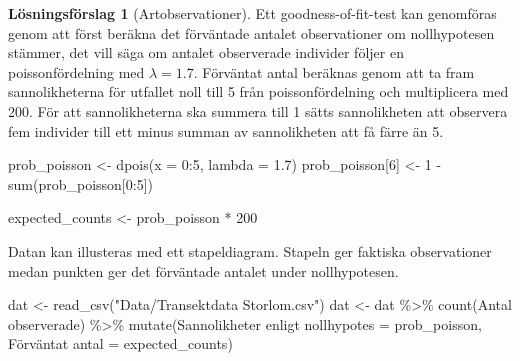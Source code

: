 \documentclass[
]{book}
\newenvironment{Shaded}{\begin{snugshade}}{\end{snugshade}}
\newcommand{\AttributeTok}[1]{\textcolor[rgb]{0.77,0.63,0.00}{#1}}
\newcommand{\DecValTok}[1]{\textcolor[rgb]{0.00,0.00,0.81}{#1}}
\newcommand{\FloatTok}[1]{\textcolor[rgb]{0.00,0.00,0.81}{#1}}
\newcommand{\FunctionTok}[1]{\textcolor[rgb]{0.00,0.00,0.00}{#1}}
\newcommand{\NormalTok}[1]{#1}
\newcommand{\OtherTok}[1]{\textcolor[rgb]{0.56,0.35,0.01}{#1}}
\newcommand{\SpecialCharTok}[1]{\textcolor[rgb]{0.00,0.00,0.00}{#1}}
\newcommand{\StringTok}[1]{\textcolor[rgb]{0.31,0.60,0.02}{#1}}
\theoremstyle{definition}
\theoremstyle{definition}
\theoremstyle{definition}
\theoremstyle{definition}
\newtheorem{hypothesis}{Lösningsförslag}[chapter]
\theoremstyle{remark}
\begin{document}
\begin{hypothesis}[Artobservationer]
Ett goodness-of-fit-test kan genomföras genom att först beräkna det förväntade antalet observationer om nollhypotesen stämmer, det vill säga om antalet observerade individer följer en poissonfördelning med \(\lambda = 1.7\).
Förväntat antal beräknas genom att ta fram sannolikheterna för utfallet noll till 5 från poissonfördelning och multiplicera med 200.
För att sannolikheterna ska summera till 1 sätts sannolikheten att observera fem individer till ett minus summan av sannolikheten att få färre än 5.

\begin{Shaded}
\begin{Highlighting}[]
\NormalTok{prob\_poisson }\OtherTok{\textless{}{-}} \FunctionTok{dpois}\NormalTok{(}\AttributeTok{x =} \DecValTok{0}\SpecialCharTok{:}\DecValTok{5}\NormalTok{, }\AttributeTok{lambda =} \FloatTok{1.7}\NormalTok{)}
\NormalTok{prob\_poisson[}\DecValTok{6}\NormalTok{] }\OtherTok{\textless{}{-}} \DecValTok{1} \SpecialCharTok{{-}} \FunctionTok{sum}\NormalTok{(prob\_poisson[}\DecValTok{0}\SpecialCharTok{:}\DecValTok{5}\NormalTok{])}

\NormalTok{expected\_counts }\OtherTok{\textless{}{-}}\NormalTok{ prob\_poisson }\SpecialCharTok{*} \DecValTok{200}
\end{Highlighting}
\end{Shaded}

Datan kan illusteras med ett stapeldiagram. Stapeln ger faktiska observationer medan punkten ger det förväntade antalet under nollhypotesen.

\begin{Shaded}
\begin{Highlighting}[]
\NormalTok{dat }\OtherTok{\textless{}{-}} \FunctionTok{read\_csv}\NormalTok{(}\StringTok{"Data/Transektdata Storlom.csv"}\NormalTok{)}
\NormalTok{dat }\OtherTok{\textless{}{-}}\NormalTok{ dat }\SpecialCharTok{\%\textgreater{}\%} 
  \FunctionTok{count}\NormalTok{(}\StringTok{\textasciigrave{}}\AttributeTok{Antal observerade}\StringTok{\textasciigrave{}}\NormalTok{) }\SpecialCharTok{\%\textgreater{}\%} 
  \FunctionTok{mutate}\NormalTok{(}\StringTok{\textasciigrave{}}\AttributeTok{Sannolikheter enligt nollhypotes}\StringTok{\textasciigrave{}} \OtherTok{=}\NormalTok{ prob\_poisson,}
         \StringTok{\textasciigrave{}}\AttributeTok{Förväntat antal}\StringTok{\textasciigrave{}} \OtherTok{=}\NormalTok{ expected\_counts)}


\end{Highlighting}
\end{Shaded}
\end{hypothesis}
\end{document}
